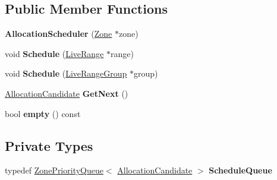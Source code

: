 \subsection*{Public Member Functions}
\begin{DoxyCompactItemize}
\item 
{\bfseries Allocation\+Scheduler} (\hyperlink{classv8_1_1internal_1_1_zone}{Zone} $\ast$zone)\hypertarget{classv8_1_1internal_1_1compiler_1_1_allocation_scheduler_a956ef2950ead9f2b11fa045d5bd2e810}{}\label{classv8_1_1internal_1_1compiler_1_1_allocation_scheduler_a956ef2950ead9f2b11fa045d5bd2e810}

\item 
void {\bfseries Schedule} (\hyperlink{classv8_1_1internal_1_1compiler_1_1_live_range}{Live\+Range} $\ast$range)\hypertarget{classv8_1_1internal_1_1compiler_1_1_allocation_scheduler_a38c05c59502d3683407a5c73844085f8}{}\label{classv8_1_1internal_1_1compiler_1_1_allocation_scheduler_a38c05c59502d3683407a5c73844085f8}

\item 
void {\bfseries Schedule} (\hyperlink{classv8_1_1internal_1_1compiler_1_1_live_range_group}{Live\+Range\+Group} $\ast$group)\hypertarget{classv8_1_1internal_1_1compiler_1_1_allocation_scheduler_ac0363114e1cb39d114e57a9466dc00b6}{}\label{classv8_1_1internal_1_1compiler_1_1_allocation_scheduler_ac0363114e1cb39d114e57a9466dc00b6}

\item 
\hyperlink{classv8_1_1internal_1_1compiler_1_1_allocation_candidate}{Allocation\+Candidate} {\bfseries Get\+Next} ()\hypertarget{classv8_1_1internal_1_1compiler_1_1_allocation_scheduler_a9701278a58e1819b4a0b4e6370bd7de7}{}\label{classv8_1_1internal_1_1compiler_1_1_allocation_scheduler_a9701278a58e1819b4a0b4e6370bd7de7}

\item 
bool {\bfseries empty} () const \hypertarget{classv8_1_1internal_1_1compiler_1_1_allocation_scheduler_adfd981f23281187a10e3fab7e91593eb}{}\label{classv8_1_1internal_1_1compiler_1_1_allocation_scheduler_adfd981f23281187a10e3fab7e91593eb}

\end{DoxyCompactItemize}
\subsection*{Private Types}
\begin{DoxyCompactItemize}
\item 
typedef \hyperlink{classv8_1_1internal_1_1_zone_priority_queue}{Zone\+Priority\+Queue}$<$ \hyperlink{classv8_1_1internal_1_1compiler_1_1_allocation_candidate}{Allocation\+Candidate} $>$ {\bfseries Schedule\+Queue}\hypertarget{classv8_1_1internal_1_1compiler_1_1_allocation_scheduler_a043b2cf4cd6202733136b679677ec127}{}\label{classv8_1_1internal_1_1compiler_1_1_allocation_scheduler_a043b2cf4cd6202733136b679677ec127}

\end{DoxyCompactItemize}
